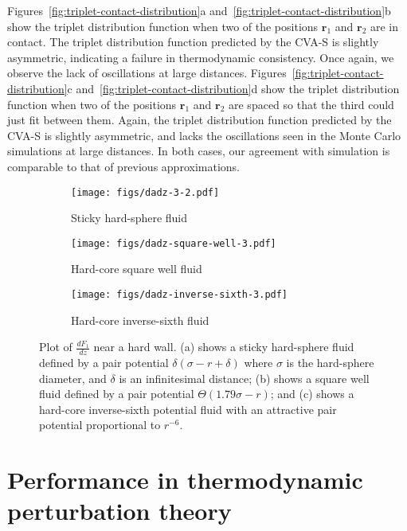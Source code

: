 \documentclass[letterpaper,twocolumn,amsmath,amssymb,pre,aps,10pt]{revtex4-1}
\newcommand{\rr}{\textbf{r}}
\begin{document}
Figures~\ref{fig:triplet-contact-distribution}a
and~\ref{fig:triplet-contact-distribution}b show the triplet
distribution function when two of the positions $\rr_1$ and $\rr_2$
are in contact.  The triplet distribution function predicted by the
CVA-S is slightly asymmetric, indicating a failure in thermodynamic
consistency.  Once again, we observe the lack of oscillations at large
distances.  Figures~\ref{fig:triplet-contact-distribution}c
and~\ref{fig:triplet-contact-distribution}d show the triplet
distribution function when two of the positions $\rr_1$ and $\rr_2$
are spaced so that the third could just fit between them.  Again, the
triplet distribution function predicted by the CVA-S is slightly
asymmetric, and lacks the oscillations seen in the Monte Carlo
simulations at large distances.  In both cases, our agreement with
simulation is comparable to that of previous approximations.

\begin{figure}
  \begin{subfigure}{1.0\columnwidth}
    \texttt{[image: figs/dadz-3-2.pdf]}
    \vspace{-0.8cm}
    \caption{Sticky hard-sphere fluid}\label{fig:dadz-delta}
  \end{subfigure}
  \begin{subfigure}{1.0\columnwidth}
    \texttt{[image: figs/dadz-square-well-3.pdf]}
    \vspace{-0.8cm}
    \caption{Hard-core square well fluid}\label{fig:dadz-square-well}
  \end{subfigure}
  \begin{subfigure}{1.0\columnwidth}
    \texttt{[image: figs/dadz-inverse-sixth-3.pdf]}
    \vspace{-0.8cm}
    \caption{Hard-core inverse-sixth fluid}\label{fig:dadz-inverse-sixth}
  \end{subfigure}
  \caption{Plot of $\frac{dF_1}{dz}$ near a hard wall.  (a) shows a
    sticky hard-sphere fluid defined by a pair potential
    $\delta(\sigma-r+\delta)$ where $\sigma$ is the hard-sphere
    diameter, and $\delta$ is an infinitesimal distance; (b) shows a
    square well fluid defined by a pair potential $\Theta(1.79
    \sigma-r)$; and (c) shows a hard-core inverse-sixth potential
    fluid with an attractive pair potential proportional to $r^{-6}$.
  }
  \label{fig:dadz}
\end{figure}

\section{Performance in thermodynamic perturbation theory}
\end{document}
